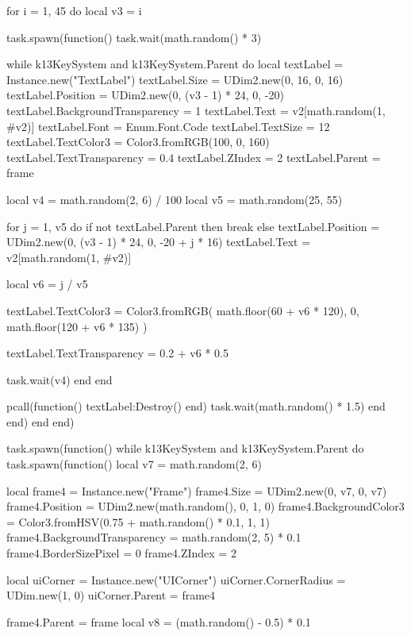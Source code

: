     for i = 1, 45 do
      local v3 = i

      task.spawn(function()
        task.wait(math.random() * 3)

        while k13KeySystem and k13KeySystem.Parent do
          local textLabel = Instance.new("TextLabel")
          textLabel.Size = UDim2.new(0, 16, 0, 16)
          textLabel.Position = UDim2.new(0, (v3 - 1) * 24, 0, -20)
          textLabel.BackgroundTransparency = 1
          textLabel.Text = v2[math.random(1, #v2)]
          textLabel.Font = Enum.Font.Code
          textLabel.TextSize = 12
          textLabel.TextColor3 = Color3.fromRGB(100, 0, 160)
          textLabel.TextTransparency = 0.4
          textLabel.ZIndex = 2
          textLabel.Parent = frame

          local v4 = math.random(2, 6) / 100
          local v5 = math.random(25, 55)

          for j = 1, v5 do
            if not textLabel.Parent then
              break
            else
              textLabel.Position = UDim2.new(0, (v3 - 1) * 24, 0, -20 + j * 16)
              textLabel.Text = v2[math.random(1, #v2)]

              local v6 = j / v5

              textLabel.TextColor3 = Color3.fromRGB(
                math.floor(60 + v6 * 120), 0, math.floor(120 + v6 * 135)
              )

              textLabel.TextTransparency = 0.2 + v6 * 0.5

              task.wait(v4)
            end
          end

          pcall(function() textLabel:Destroy() end)
          task.wait(math.random() * 1.5)
        end
      end)
    end
  end)

  task.spawn(function()
    while k13KeySystem and k13KeySystem.Parent do
      task.spawn(function()
        local v7 = math.random(2, 6)

        local frame4 = Instance.new("Frame")
        frame4.Size = UDim2.new(0, v7, 0, v7)
        frame4.Position = UDim2.new(math.random(), 0, 1, 0)
        frame4.BackgroundColor3 = Color3.fromHSV(0.75 + math.random() * 0.1, 1, 1)
        frame4.BackgroundTransparency = math.random(2, 5) * 0.1
        frame4.BorderSizePixel = 0
        frame4.ZIndex = 2

        local uiCorner = Instance.new("UICorner")
        uiCorner.CornerRadius = UDim.new(1, 0)
        uiCorner.Parent = frame4

        frame4.Parent = frame
        local v8 = (math.random() - 0.5) * 0.1

